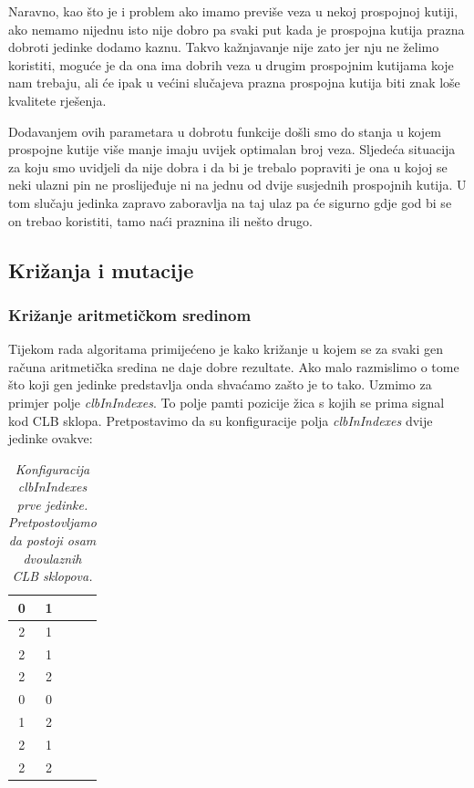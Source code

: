 \documentclass[times, utf8, zavrsni]{fer}
\begin{document}
Naravno, kao što je i problem ako imamo previše veza u nekoj prospojnoj kutiji, ako nemamo nijednu isto nije dobro pa svaki put kada je prospojna kutija prazna dobroti jedinke dodamo kaznu. Takvo kažnjavanje nije zato jer nju ne želimo koristiti, moguće je da ona ima dobrih veza u drugim prospojnim kutijama koje nam trebaju, ali će ipak u većini slučajeva prazna prospojna kutija biti znak loše kvalitete rješenja. 


Dodavanjem ovih parametara u dobrotu funkcije došli smo do stanja u kojem prospojne kutije više manje imaju uvijek optimalan broj veza. Sljedeća situacija za koju smo uvidjeli da nije dobra i da bi je trebalo popraviti je ona u kojoj se neki ulazni pin ne proslijeđuje ni na jednu od dvije susjednih prospojnih kutija. U tom slučaju jedinka zapravo zaboravlja na taj ulaz pa će sigurno gdje god bi se on trebao koristiti, tamo naći praznina ili nešto drugo. 

\subsection{Križanja i mutacije}

\subsubsection{Križanje aritmetičkom sredinom}


Tijekom rada algoritama primijećeno je kako križanje u kojem se za svaki gen računa aritmetička sredina ne daje dobre rezultate. Ako malo razmislimo o tome što koji gen jedinke predstavlja onda shvaćamo zašto je to tako. Uzmimo za primjer polje \emph{clbInIndexes}. To polje pamti pozicije žica s kojih se prima signal kod CLB sklopa. Pretpostavimo da su konfiguracije polja \emph{clbInIndexes} dvije jedinke ovakve:

\begin{table}[H]
	\caption{\emph{Konfiguracija \emph{clbInIndexes} prve jedinke. Pretpostovljamo da postoji osam dvoulaznih CLB sklopova.}}
	\label{chromoClbIndex1}
	\centering
	\begin{tabular}{|c|c|c|c|} \hline
		0 & 1 \\ \hline
		2 & 1 \\ \hline
		2 & 1 \\ \hline
		2 & 2 \\ \hline
		0 & 0 \\ \hline
		1 & 2 \\ \hline
		2 & 1 \\ \hline
		2 & 2 \\ \hline
	\end{tabular}
\end{table}
\end{document}
